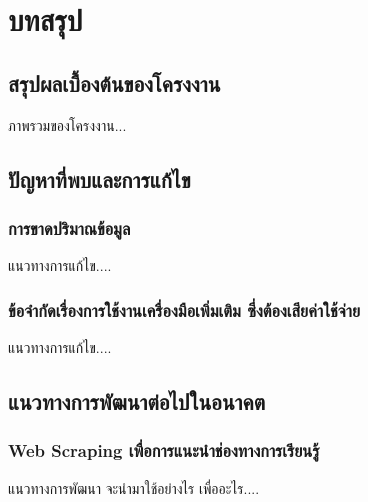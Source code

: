 \chapter{บทสรุป}

\section{สรุปผลเบื้องต้นของโครงงาน}
\par{ภาพรวมของโครงงาน...}

\section{ปัญหาที่พบและการแก้ไข}
\subsection{การขาดปริมาณข้อมูล}
\par{แนวทางการแก้ไข....}
\subsection{ข้อจำกัดเรื่องการใช้งานเครื่องมือเพิ่มเติม ซึ่งต้องเสียค่าใช้จ่าย}
\par{แนวทางการแก้ไข....}

\section{แนวทางการพัฒนาต่อไปในอนาคต}
\subsection{Web Scraping เพื่อการแนะนำช่องทางการเรียนรู้}
\par{แนวทางการพัฒนา จะนำมาใช้อย่างไร เพื่ออะไร....}